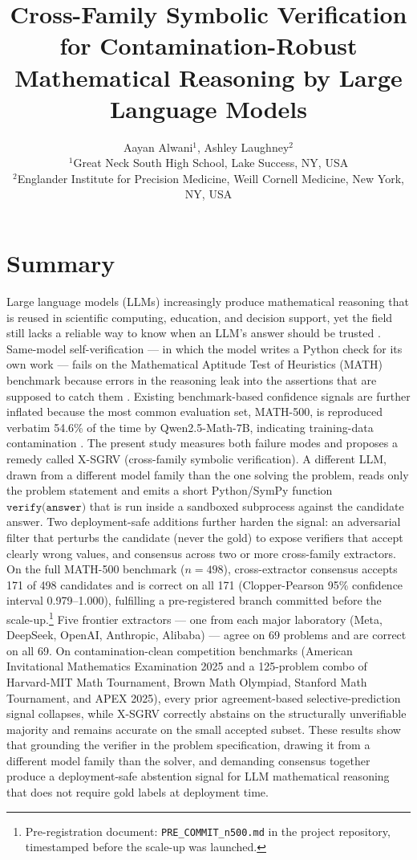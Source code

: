 \documentclass[11pt]{article}
\title{\bfseries Cross-Family Symbolic Verification for Contamination-Robust Mathematical Reasoning by Large Language Models}
\author{
Aayan Alwani$^{1}$, Ashley Laughney$^{2}$ \\[2pt]
\small $^{1}$Great Neck South High School, Lake Success, NY, USA \\
\small $^{2}$Englander Institute for Precision Medicine, Weill Cornell Medicine, New York, NY, USA
}
\date{}
\begin{document}
\maketitle

\section*{Summary}

Large language models (LLMs) increasingly produce mathematical reasoning that is reused in scientific computing, education, and decision support, yet the field still lacks a reliable way to know when an LLM's answer should be trusted \citep{kuhn2023semantic, farquhar2024nature}. Same-model self-verification --- in which the model writes a Python check for its own work --- fails on the Mathematical Aptitude Test of Heuristics (MATH) benchmark because errors in the reasoning leak into the assertions that are supposed to catch them \citep{huang2024selfcorrect, tyen2024llm, stechly2024selfverify}. Existing benchmark-based confidence signals are further inflated because the most common evaluation set, MATH-500, is reproduced verbatim 54.6\% of the time by Qwen2.5-Math-7B, indicating training-data contamination \citep{wu2025contam}. The present study measures both failure modes and proposes a remedy called X-SGRV (cross-family symbolic verification). A different LLM, drawn from a different model family than the one solving the problem, reads only the problem statement and emits a short Python/SymPy function $\texttt{verify(answer)}$ that is run inside a sandboxed subprocess against the candidate answer. Two deployment-safe additions further harden the signal: an adversarial filter that perturbs the candidate (never the gold) to expose verifiers that accept clearly wrong values, and consensus across two or more cross-family extractors. On the full MATH-500 benchmark ($n{=}498$), cross-extractor consensus accepts 171 of 498 candidates and is correct on all 171 (Clopper-Pearson 95\% confidence interval 0.979--1.000), fulfilling a pre-registered branch committed before the scale-up.\footnote{Pre-registration document: \texttt{PRE\_COMMIT\_n500.md} in the project repository, timestamped before the scale-up was launched.} Five frontier extractors --- one from each major laboratory (Meta, DeepSeek, OpenAI, Anthropic, Alibaba) --- agree on 69 problems and are correct on all 69. On contamination-clean competition benchmarks (American Invitational Mathematics Examination 2025 and a 125-problem combo of Harvard-MIT Math Tournament, Brown Math Olympiad, Stanford Math Tournament, and APEX 2025), every prior agreement-based selective-prediction signal collapses, while X-SGRV correctly abstains on the structurally unverifiable majority and remains accurate on the small accepted subset. These results show that grounding the verifier in the problem specification, drawing it from a different model family than the solver, and demanding consensus together produce a deployment-safe abstention signal for LLM mathematical reasoning that does not require gold labels at deployment time.
\end{document}
